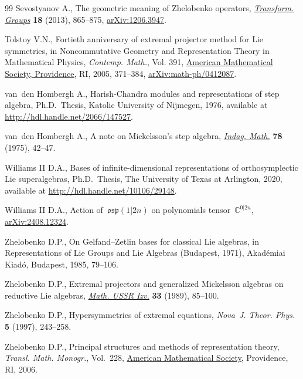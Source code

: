 \documentclass[10pt,a4paper]{amsart}
\numberwithin{equation}{section}
\begin{document}
\begin{thebibliography}{99}
Sevostyanov A., The geometric meaning of {Z}helobenko operators,
 \href{https://doi.org/10.1007/s00031-013-9234-9}{\textit{Transform. Groups}} \textbf{18} (2013), 865--875, \href{https://arxiv.org/abs/1206.3947}{arXiv:1206.3947}.

Tolstoy V.N., Fortieth anniversary of extremal projector method for {L}ie
 symmetries, in Noncommutative {G}eometry and {R}epresentation {T}heory in
 {M}athematical {P}hysics, \textit{Contemp. Math.}, Vol. 391, \href{https://doi.org/10.1090/conm/391/07342}{American
 Mathematical Society, Providence}, RI, 2005, 371--384,
 \href{https://arxiv.org/abs/math-ph/0412087}{arXiv:math-ph/0412087}.

van~den Hombergh A., Harish-Chandra modules and representations of step
 algebra, Ph.D.~Thesis, {K}atolic University of {N}ijmegen, 1976, available at
 \url{http://hdl.handle.net/2066/147527}.

van~den Hombergh A., A note on {M}ickelsson's step algebra, \href{https://doi.org/10.1016/1385-7258(75)90013-X}{\textit{Indag.
 Math.}} \textbf{78} (1975), 42--47.

Williams II D.A., Bases of infinite-dimensional representations of
 orthosymplectic {L}ie superalgebras, Ph.D.~Thesis, {T}he University of
 {T}exas at {A}rlington, 2020, available at
 \url{http://hdl.handle.net/10106/29148}.

Williams II D.A., Action of~$\mathfrak{osp}(1|2n)$ on polynomials
 tensor~$\mathbb{C}^{0|2n}$, \href{https://arxiv.org/abs/2408.12324}{arXiv:2408.12324}.

Zhelobenko D.P., On {G}elfand--{Z}etlin bases for classical {L}ie algebras, in
 Representations of {L}ie {G}roups and {L}ie {A}lgebras ({B}udapest, 1971),
 Akad\'emiai Kiad\'o, Budapest, 1985, 79--106.

Zhelobenko D.P., Extremal projectors and generalized {M}ickelsson algebras on
 reductive {L}ie algebras, \href{https://doi.org/10.1070/IM1989v033n01ABEH000815}{\textit{Math. USSR Izv.}} \textbf{33} (1989),
 85--100.

Zhelobenko D.P., Hypersymmetries of extremal equations, \textit{Nova~J. Theor.
 Phys.} \textbf{5} (1997), 243--258.

Zhelobenko D.P., Principal structures and methods of representation theory,
 \textit{Transl. Math. Monogr.}, Vol.~228, \href{https://doi.org/10.1090/mmono/228}{American Mathematical Society},
 Providence, RI, 2006.

\end{thebibliography}
\end{document}
